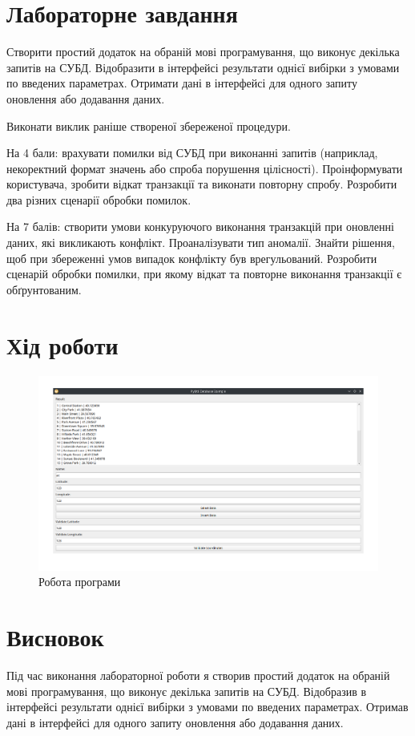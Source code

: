 \documentclass[14pt]{extreport}
\begin{document}
\begin{normalsize}
	\section*{Лабораторне завдання}
Створити простий додаток на обраній мові програмування, що виконує декілька запитів на СУБД. Відобразити в інтерфейсі результати однієї вибірки з умовами по введених параметрах. Отримати дані в інтерфейсі для одного запиту оновлення або додавання даних.

Виконати виклик раніше створеної збереженої процедури.

На 4 бали: врахувати помилки від СУБД при виконанні запитів (наприклад, некоректний формат значень або спроба порушення цілісності). Проінформувати користувача, зробити відкат транзакції та виконати повторну спробу. Розробити два різних сценарії обробки помилок.

На 7 балів: створити умови конкуруючого виконання транзакцій при оновленні даних, які викликають конфлікт. Проаналізувати тип аномалії. Знайти рішення, щоб при збереженні умов випадок конфлікту був врегульований. Розробити сценарій обробки помилки, при якому відкат та повторне виконання транзакції є обґрунтованим.
	
	
	\section*{Хід роботи}
	\begin{figure}[H]
		\centering
		\includegraphics[scale=0.45]{1}
		\caption{Робота програми}
	\end{figure}
	
	
	\section*{Висновок}
	Під час виконання лабораторної роботи я створив простий додаток на обраній мові програмування, що виконує декілька запитів на СУБД. Відобразив в інтерфейсі результати однієї вибірки з умовами по введених параметрах. Отримав дані в інтерфейсі для одного запиту оновлення або додавання даних.
	 
\end{normalsize}
\end{document}
